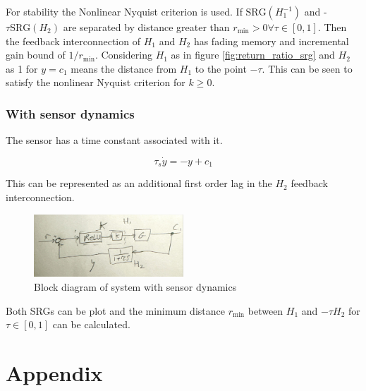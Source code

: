 \documentclass{article}
\begin{document}
For stability the Nonlinear Nyquist criterion is used.
If $\text{SRG}(H_1^{-1})$ and -$\tau \text{SRG}(H_2)$ are separated by distance greater than $r_\text{min} > 0 \forall \tau \in [0,1]$.
Then the feedback interconnection of $H_1$ and $H_2$ has fading memory and incremental gain bound of $1/r_\text{min}$.
Considering $H_1$ as in figure \ref{fig:return_ratio_srg} and $H_2$ as 1 for $y=c_1$ means the distance from $H_1$ to the point $-\tau$.
This can be seen to satisfy the nonlinear Nyquist criterion for $k \geq 0$.

\subsubsection{With sensor dynamics}

The sensor has a time constant associated with it.

\begin{equation}
    \tau_s \dot{y} = -y + c_1
\end{equation}

This can be represented as an additional first order lag in the $H_2$ feedback interconnection.

\begin{figure}[H]
    \centering
    \includegraphics[width=0.5\textwidth]{figures/sensor_dynamics.jpg}
    \caption{Block diagram of system with sensor dynamics}
    \label{fig:sensor_dynamic_block}
\end{figure}

Both SRGs can be plot and the minimum distance $r_\text{min}$ between $H_1$ and $-\tau H_2 $ for $\tau \in [0,1]$ can be calculated.

\section{Appendix}
\end{document}
